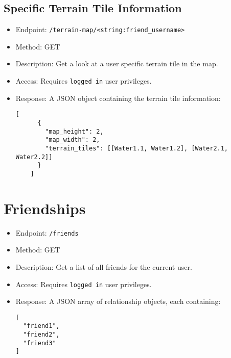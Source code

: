 \documentclass[12pt]{article}
\begin{document}
\subsection{Specific Terrain Tile Information}
\begin{itemize}
    \item Endpoint: \texttt{/terrain-map/<string:friend\_username>}
    \item Method: GET
    \item Description: Get a look at a user specific terrain tile in the map.
    \item Access: Requires \texttt{logged in} user privileges.
    \item Response: A JSON object containing the terrain tile information:
    \begin{lstlisting}[breaklines]
    [
      {
        "map_height": 2,
        "map_width": 2,
        "terrain_tiles": [[Water1.1, Water1.2], [Water2.1, Water2.2]]
      }
    ]
    \end{lstlisting}
\end{itemize}

\section{Friendships}
\begin{itemize}
    \item Endpoint: \texttt{/friends}
    \item Method: GET
    \item Description: Get a list of all friends for the current user.
    \item Access: Requires \texttt{logged in} user privileges.
    \item Response: A JSON array of relationship objects, each containing:
    \begin{verbatim}
[
  "friend1",
  "friend2",
  "friend3"
]
    \end{verbatim}
\end{itemize}
\end{document}
